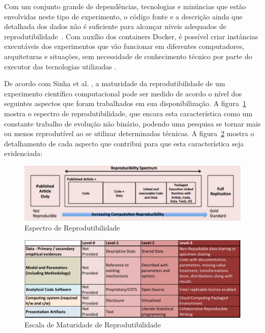 \documentclass[sigconf]{acmart}
\begin{document}
Com um conjunto grande de dependências, tecnologias e minúncias que estão envolvidas neste tipo de experimento, o código fonte e a descrição ainda que detalhada dos dados não é suficiente para alcançar níveis adequados de reprodutibilidade~\cite{ince2012}. Com auxílio dos containers Docker, é possível criar instâncias executáveis dos experimentos que vão funcionar em diferentes computadores, arquiteturas e situações, sem necessidade de conhecimento técnico por parte do executor das tecnologias utilizadas \cite{boettiger2015}.

De acordo com Sinha et al. \cite{sinha2016}, a maturidade da reprodutibilidade de um experimento científico computacional pode ser medido de acordo o nível dos seguintes aspectos que foram trabalhados em sua disponibilização. A figura~\ref{fig:espectro_reprodutibilidade} mostra o espectro de reprodutibilidade, que encara esta característica como um constante trabalho de evolução não binário, podendo uma pesquisa se tornar mais ou menos reprodutível ao se utilizar determinadas técnicas. A figura~\ref{fig:escala_reprodutibilidade} mostra o detalhamento de cada aspecto que contribui para que esta característica seja evidenciada:

\begin{figure}[!htbp]
 \includegraphics[width=\textwidth]{espectro_reprodutibilidade}
 \caption{Espectro de Reprodutibilidade}\label{fig:espectro_reprodutibilidade}
\end{figure}

\begin{figure}[!htbp]
 \includegraphics[width=\columnwidth]{escala_reprodutibilidade}
 \caption{Escala de Maturidade de Reprodutibilidade}\label{fig:escala_reprodutibilidade}
\end{figure}
\end{document}
